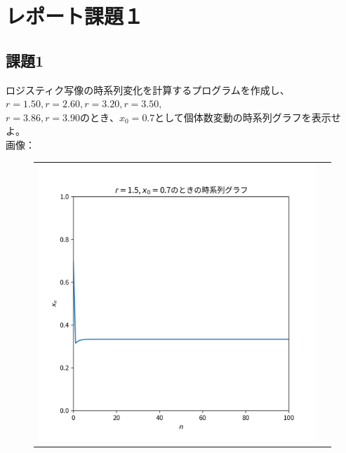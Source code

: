 \section{レポート課題１}
\subsection{課題1}
ロジスティク写像の時系列変化を計算するプログラムを作成し、$r = 1.50, r = 2.60,r = 3.20, r = 3.50,$ \\
$r = 3.86, r = 3.90 のとき、x_0 = 0.7$として個体数変動の時系列グラフを表示せよ。\\
画像：\\
\begin{figure}[htbp]
  \begin{tabular}{cc}
    \begin{minipage}[t]{0.45\hsize}
      \centering
      \includegraphics[keepaspectratio, scale=0.3]{images/Problem1/ctest2_1_1.png}
    \end{minipage} &
    \begin{minipage}[t]{0.45\hsize}
      \centering

\end{minipage}
\end{tabular}
\end{figure}
